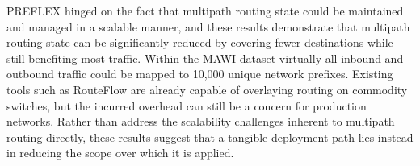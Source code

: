 \ac{PREFLEX} hinged on the fact that multipath routing state could be maintained and managed in a scalable manner, and these results demonstrate that multipath routing state can be significantly reduced by covering fewer destinations while still benefiting most traffic.
Within the \ac{MAWI} dataset virtually all inbound and outbound traffic could be mapped to 10,000 unique network prefixes. 
Existing tools such as RouteFlow \cite{Rothenberg:2012:RRC:2342441.2342445} are already capable of overlaying routing on commodity switches, but the incurred overhead can still be a concern for production networks.
Rather than address the scalability challenges inherent to multipath routing directly, these results suggest that a tangible deployment path lies instead in reducing the scope over which it is applied.

